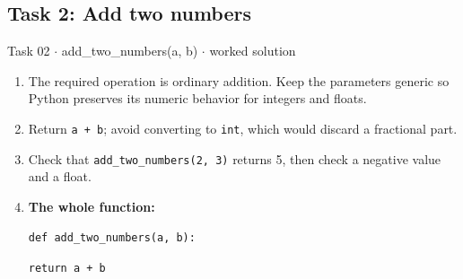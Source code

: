 \documentclass[11pt]{article}
\begin{document}
\begin{keepsection}\subsection{Task 2: Add two numbers}

\begin{workedbox}{Task 02 \ensuremath{\cdot} add\_two\_numbers(a, b) \ensuremath{\cdot} worked solution}
\begin{enumerate}
\item The required operation is ordinary addition. Keep the parameters generic so Python preserves its numeric behavior for integers and floats.
\item Return \texttt{a + b}; avoid converting to \texttt{int}, which would discard a fractional part.
\item Check that \texttt{add\_two\_numbers(2, 3)} returns 5, then check a negative value and a float.
\item {}
\textbf{The whole function:}
\begin{tcolorbox}[colback=Paperblue,colframe=Paperblue,boxrule=0pt,arc=0pt,left=7pt,right=7pt,top=5pt,bottom=5pt]\small\sloppy
\noindent\hspace*{0em}\texttt{def add\_two\_numbers(a, b):}\par
\noindent\hspace*{1em}\texttt{return a + b}\par
\end{tcolorbox}
\end{enumerate}
\end{workedbox}

\end{keepsection}
\end{document}
